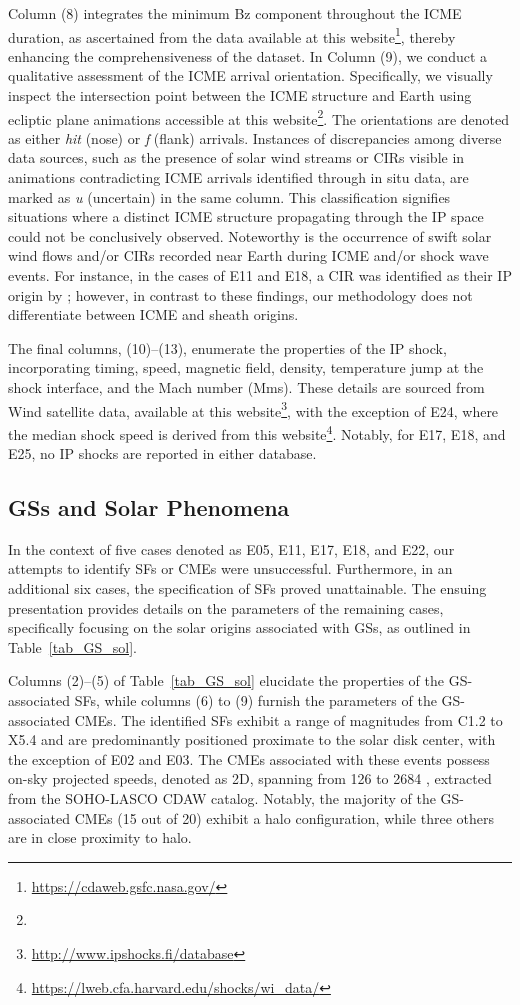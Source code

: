 Column (8) integrates the minimum Bz component throughout the ICME duration, as ascertained from the data available at this website\footnote{\url{https://cdaweb.gsfc.nasa.gov/}}, thereby enhancing the comprehensiveness of the dataset. In Column (9), we conduct a qualitative assessment of the ICME arrival orientation. Specifically, we visually inspect the intersection point between the ICME structure and Earth using ecliptic plane animations accessible at this website\footnote{\helioweatherurl}. The orientations are denoted as either \textit{hit} (nose) or \textit{f} (flank) arrivals. Instances of discrepancies among diverse data sources, such as the presence of solar wind streams or CIRs visible in animations contradicting ICME arrivals identified through in situ data, are marked as \textit{u} (uncertain) in the same column. This classification signifies situations where a distinct ICME structure propagating through the IP space could not be conclusively observed. Noteworthy is the occurrence of swift solar wind flows and/or CIRs recorded near Earth during ICME and/or shock wave events. For instance, in the cases of E11 and E18, a CIR was identified as their IP origin by \citet{qiu_2022}; however, in contrast to these findings, our methodology does not differentiate between ICME and sheath origins.

The final columns, (10)–(13), enumerate the properties of the IP shock, incorporating timing, speed, magnetic field, density, temperature jump at the shock interface, and the Mach number (Mms). These details are sourced from Wind satellite data, available at this website\footnote{\url{http://www.ipshocks.fi/database}}, with the exception of E24, where the median shock speed is derived from this website\footnote{\url{https://lweb.cfa.harvard.edu/shocks/wi_data/}}. Notably, for E17, E18, and E25, no IP shocks are reported in either database.

\subsection{GSs and Solar Phenomena}
In the context of five cases denoted as E05, E11, E17, E18, and E22, our attempts to identify SFs or CMEs were unsuccessful. Furthermore, in an additional six cases, the specification of SFs proved unattainable. The ensuing presentation provides details on the parameters of the remaining cases, specifically focusing on the solar origins associated with GSs, as outlined in Table~\ref{tab_GS_sol}.

Columns (2)–(5) of Table~\ref{tab_GS_sol} elucidate the properties of the GS-associated SFs, while columns (6) to (9) furnish the parameters of the GS-associated CMEs. The identified SFs exhibit a range of magnitudes from C1.2 to X5.4 and are predominantly positioned proximate to the solar disk center, with the exception of E02 and E03. The CMEs associated with these events possess on-sky projected speeds, denoted as 2D, spanning from 126 to 2684 \kms, extracted from the SOHO-LASCO CDAW catalog. Notably, the majority of the GS-associated CMEs (15 out of 20) exhibit a halo configuration, while three others are in close proximity to halo.

